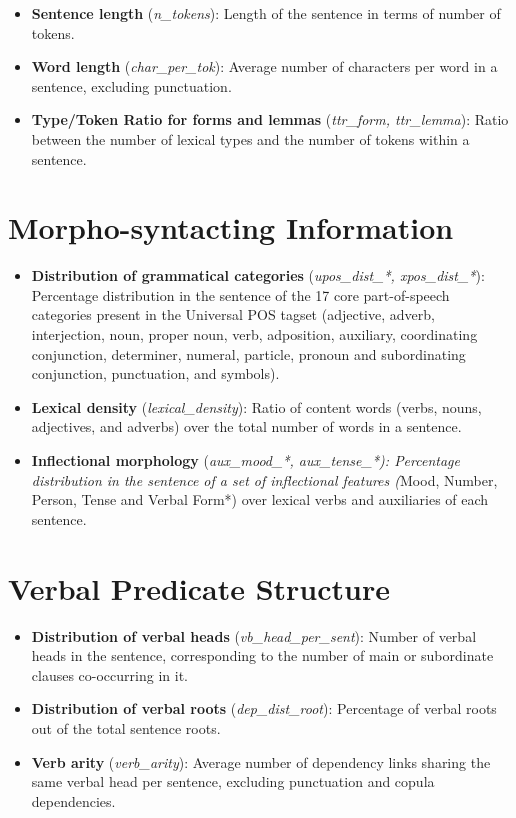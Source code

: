 \documentclass[a4paper, nobind]{templates/ociamthesis}
\begin{document}
\begin{itemize}
\item
  \textbf{Sentence length} (\emph{n\_tokens}): Length of the sentence in terms of number of tokens.
\item
  \textbf{Word length} (\emph{char\_per\_tok}): Average number of characters per word in a sentence, excluding punctuation.
\item
  \textbf{Type/Token Ratio for forms and lemmas} (\emph{ttr\_form, ttr\_lemma}): Ratio between the number of lexical types and the number of tokens within a sentence.
\end{itemize}

\hypertarget{morpho-syntacting-information}{%
\section{Morpho-syntacting Information}\label{morpho-syntacting-information}}

\begin{itemize}
\item
  \textbf{Distribution of grammatical categories} (\emph{upos\_dist\_*, xpos\_dist\_*}): Percentage distribution in the sentence of the 17 core part-of-speech categories present in the Universal POS tagset (adjective, adverb, interjection, noun, proper noun, verb, adposition, auxiliary, coordinating conjunction, determiner, numeral, particle, pronoun and subordinating conjunction, punctuation, and symbols).
\item
  \textbf{Lexical density} (\emph{lexical\_density}): Ratio of content words (verbs, nouns, adjectives, and adverbs) over the total number of words in a sentence.
\item
  \textbf{Inflectional morphology} (\emph{aux\_mood\_*, aux\_tense\_*): Percentage distribution in the sentence of a set of inflectional features (}Mood, Number, Person, Tense and Verbal Form*) over lexical verbs and auxiliaries of each sentence.
\end{itemize}

\hypertarget{verbal-predicate-structure}{%
\section{Verbal Predicate Structure}\label{verbal-predicate-structure}}

\begin{itemize}
\item
  \textbf{Distribution of verbal heads} (\emph{vb\_head\_per\_sent}): Number of verbal heads in the sentence, corresponding to the number of main or subordinate clauses co-occurring in it.
\item
  \textbf{Distribution of verbal roots} (\emph{dep\_dist\_root}): Percentage of verbal roots out of the total sentence roots.
\item
  \textbf{Verb arity} (\emph{verb\_arity}): Average number of dependency links sharing the same verbal head per sentence, excluding punctuation and copula dependencies.
\end{itemize}
\end{document}
